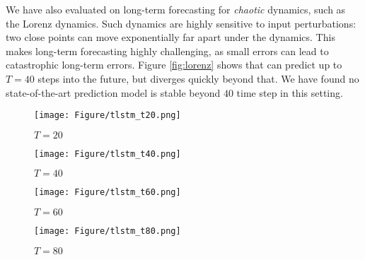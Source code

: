  
 
We have also evaluated \trnn{} on long-term forecasting for \textit{chaotic} dynamics, such as the Lorenz dynamics. Such dynamics are highly sensitive to input perturbations: two close points can move exponentially far apart under the dynamics. This makes long-term forecasting highly challenging, as small errors can lead to catastrophic long-term errors. Figure \ref{fig:lorenz} shows that \trnn{} can predict up to $T=40$ steps into the future, but diverges quickly beyond that. We have found no state-of-the-art prediction model is stable beyond $40$ time step in this setting.
%
 \begin{figure*}[h]
	\begin{center}
		\begin{subfigure}[b]{0.23\textwidth}		\texttt{[image: Figure/tlstm\_t20.png]}
			\caption{$T=20$}
			\label{fig:lorenz_20}
		\end{subfigure}
		\begin{subfigure}[b]{0.23\textwidth}			\texttt{[image: Figure/tlstm\_t40.png]}
			\caption{$T=40$}
			\label{fig:lorenz_40}
		\end{subfigure}
		\begin{subfigure}[b]{0.23\textwidth}
			\texttt{[image: Figure/tlstm\_t60.png]}
			\caption{$T=60$}
			\label{fig:lorenz_60}
		\end{subfigure}
		\begin{subfigure}[b]{0.23\textwidth}
			\texttt{[image: Figure/tlstm\_t80.png]}
			\caption{$T=80$}
			\label{fig:lorenz_80}
			\label{fig:f1}
		\end{subfigure}
		\caption{\ref{fig:lorenz_data} Lorenz attraction  with dynamics (blue) and sampled data (red).  \ref{fig:lorenz_20}, \ref{fig:lorenz_40}, \ref{fig:lorenz_60} ,\ref{fig:lorenz_80}   \tlstm{} long-term predictions for different forecasting horizons $T$ versus the ground truth (blue). \tlstm{} shows consistent predictions over increasing horizons $T$.}
		\label{fig:lorenz}
	\end{center}
\vskip -0.5in
\end{figure*}

